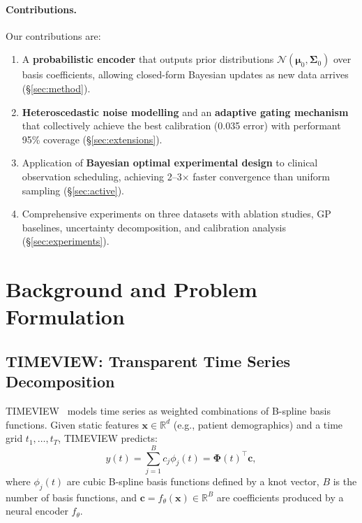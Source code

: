 \documentclass[final]{article}
\begin{document}
\paragraph{Contributions.} Our contributions are:
\begin{enumerate}
    \item A \textbf{probabilistic encoder} that outputs prior distributions $\mathcal{N}(\boldsymbol{\mu}_0, \boldsymbol{\Sigma}_0)$ over basis coefficients, allowing closed-form Bayesian updates as new data arrives (\S\ref{sec:method}).
    \item \textbf{Heteroscedastic noise modelling} and an \textbf{adaptive gating mechanism} that collectively achieve the best calibration (0.035 error) with performant 95\% coverage (\S\ref{sec:extensions}).
    \item Application of \textbf{Bayesian optimal experimental design} to clinical observation scheduling, achieving 2--3$\times$ faster convergence than uniform sampling (\S\ref{sec:active}).
    \item Comprehensive experiments on three datasets with ablation studies, GP baselines, uncertainty decomposition, and calibration analysis (\S\ref{sec:experiments}).
\end{enumerate}

\section{Background and Problem Formulation}
\label{sec:background}

\subsection{TIMEVIEW: Transparent Time Series Decomposition}

TIMEVIEW~\citep{kacprzyk2024towards} models time series as weighted combinations of B-spline basis functions. Given static features $\mathbf{x} \in \mathbb{R}^d$ (e.g., patient demographics) and a time grid $t_1, \ldots, t_T$, TIMEVIEW predicts:
\begin{equation}
    y(t) = \sum_{j=1}^{B} c_j \phi_j(t) = \boldsymbol{\Phi}(t)^\top \mathbf{c},
    \label{eq:timeview}
\end{equation}
where $\phi_j(t)$ are cubic B-spline basis functions defined by a knot vector, $B$ is the number of basis functions, and $\mathbf{c} = f_\theta(\mathbf{x}) \in \mathbb{R}^B$ are coefficients produced by a neural encoder $f_\theta$.
\end{document}
